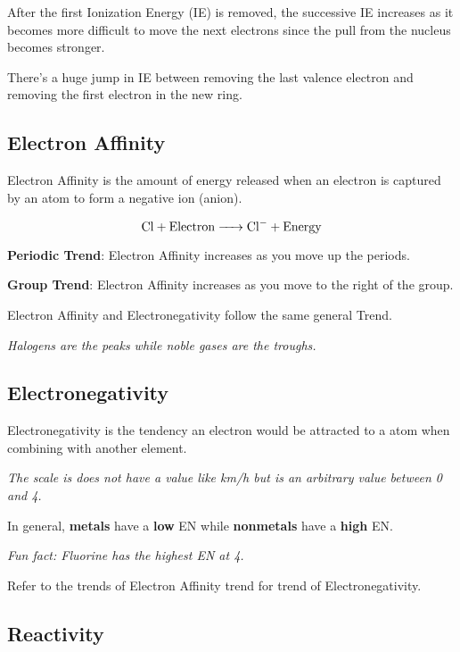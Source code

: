 \documentclass[12pt]{article}
\begin{document}
After the first Ionization Energy (IE) is removed, the successive IE increases as it becomes more difficult to move the next electrons since the pull from the nucleus becomes stronger.

\medskip
\noindent There's a huge jump in IE between removing the last valence electron and removing the first electron in the new ring.

\subsection{Electron Affinity}

Electron Affinity is the amount of energy released when an electron is captured by an atom to form a negative ion (anion).

$$\ce{Cl +\text{Electron} -> Cl^- + \text{Energy}}$$

\medskip

\noindent \textbf{Periodic Trend}: Electron Affinity increases as you move up the periods.

\noindent\textbf{Group Trend}: Electron Affinity increases as you move to the right of the group.

\medskip
\noindent Electron Affinity and Electronegativity follow the same general Trend.

\emph{Halogens are the peaks while noble gases are the troughs.}

\subsection{Electronegativity}

Electronegativity is the tendency an electron would be attracted to a atom when combining with another element.

\emph{The scale is does not have a value like km/h but is an arbitrary value between 0 and 4.}

\noindent In general, \textbf{metals} have a \textbf{low} EN while \textbf{nonmetals} have a \textbf{high} EN.

\medskip
\textit{Fun fact: Fluorine has the highest EN at 4.}

\medskip

\noindent Refer to the trends of Electron Affinity trend for trend of Electronegativity.

\subsection{Reactivity}
\end{document}
